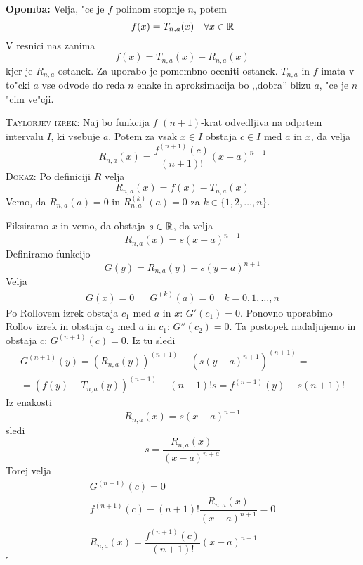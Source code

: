 \textbf{Opomba:} Velja, "ce je $f$ polinom stopnje $n$, potem
\begin{equation*}
f(x) = T_{n, a} (x) \quad \forall x \in \mathbb{R}
\end{equation*}
%
V resnici nas zanima
\begin{equation*}
f(x) = T_{n, a}(x) + R_{n, a}(x)
\end{equation*}
kjer je $R_{n, a}$ ostanek. Za uporabo je pomembno oceniti ostanek. $T_{n, a}$ in $f$ imata v to"cki $a$ vse odvode do reda $n$ enake in aproksimacija bo ,,dobra'' blizu $a$, "ce je $n$ "cim ve"cji.

\textsc{Taylorjev izrek:} Naj bo funkcija $f$ $(n+1)$-krat odvedljiva na odprtem intervalu $I$, ki vsebuje $a$. Potem za vsak $x \in I$ obstaja $c \in I$ med $a$ in $x$, da velja
\begin{equation*}
R_{n, a}(x) = \dfrac{f^{(n+1)}(c)}{(n+1)!} (x-a)^{n+1}
\end{equation*}
\textsc{Dokaz:} Po definiciji $R$ velja
\begin{equation*}
R_{n, a}(x) = f(x) - T_{n, a}(x)
\end{equation*}
Vemo, da $R_{n, a} (a) = 0$ in $R_{n, a}^{(k)} (a) = 0$ za $k \in \{ 1, 2, \ldots, n \}$.

Fiksiramo $x$ in vemo, da obstaja $s \in \mathbb{R}$, da velja
\begin{equation*}
R_{n, a} (x) = s(x - a)^{n+1}
\end{equation*}
Definiramo funkcijo
\begin{equation*}
G(y) = R_{n, a}(y)  - s(y-a)^{n+1}
\end{equation*}
Velja
\begin{align*}
G(x) = 0 && G^{(k)}(a) = 0 \quad k = 0, 1, \ldots, n
\end{align*}
Po Rollovem izrek obstaja $c_1$ med $a$ in $x$: $G'(c_1) = 0$. Ponovno uporabimo Rollov izrek in obstaja $c_2$ med $a$ in $c_1$: $G''(c_2) = 0$. Ta postopek nadaljujemo in obstaja $c$: $G^{(n+1)}(c) = 0$. Iz tu sledi
\begin{multline*}
G^{(n+1)} (y) = (R_{n, a}(y))^{(n+1)} - (s (y-a)^{n+1})^{(n+1)} = \\
= (f(y) - T_{n, a}(y))^{(n+1)} - (n+1)!s = f^{(n+1)}(y) - s (n+1)!
\end{multline*}
Iz enakosti 
\begin{equation*}
R_{n, a}(x) = s(x - a)^{n+1}
\end{equation*}
sledi
\begin{equation*}
s = \dfrac{R_{n, a}(x)}{(x-a)^{n+a}}
\end{equation*}
Torej velja
\begin{gather*}
G^{(n+1)} (c) = 0 \\
f^{(n+1)}(c)  - (n+1)! \dfrac{R_{n, a}(x)}{(x-a)^{n+1}} = 0 \\
R_{n, a}(x) = \dfrac{f^{(n+1)} (c)}{(n+1)!} (x - a)^{n+1}
\end{gather*}
\hfill $\square$

